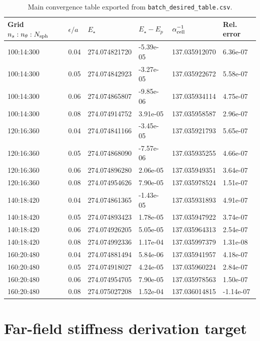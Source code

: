 \documentclass[11pt]{article}
\begin{document}
\begin{table}[p]
\centering
\caption{Main convergence table exported from \texttt{batch\_desired\_table.csv}.}
\small
\begin{tabular}{@{}llllll@{}}
\toprule
Grid $n_s:n_\theta:N_{\rm sph}$ & $\epsilon/a$ & $E_\star$ & $E_\star-E_p$ & $\alpha_{\rm cell}^{-1}$ & Rel. error \\
\midrule
100:14:300 & 0.04 & 274.074821720 & -5.39e-05 & 137.035912070 & 6.36e-07 \\
100:14:300 & 0.05 & 274.074842923 & -3.27e-05 & 137.035922672 & 5.58e-07 \\
100:14:300 & 0.06 & 274.074865807 & -9.85e-06 & 137.035934114 & 4.75e-07 \\
100:14:300 & 0.08 & 274.074914752 & 3.91e-05 & 137.035958587 & 2.96e-07 \\
120:16:360 & 0.04 & 274.074841166 & -3.45e-05 & 137.035921793 & 5.65e-07 \\
120:16:360 & 0.05 & 274.074868090 & -7.57e-06 & 137.035935255 & 4.66e-07 \\
120:16:360 & 0.06 & 274.074896280 & 2.06e-05 & 137.035949351 & 3.64e-07 \\
120:16:360 & 0.08 & 274.074954626 & 7.90e-05 & 137.035978524 & 1.51e-07 \\
140:18:420 & 0.04 & 274.074861365 & -1.43e-05 & 137.035931893 & 4.91e-07 \\
140:18:420 & 0.05 & 274.074893423 & 1.78e-05 & 137.035947922 & 3.74e-07 \\
140:18:420 & 0.06 & 274.074926205 & 5.05e-05 & 137.035964313 & 2.54e-07 \\
140:18:420 & 0.08 & 274.074992336 & 1.17e-04 & 137.035997379 & 1.31e-08 \\
160:20:480 & 0.04 & 274.074881494 & 5.84e-06 & 137.035941957 & 4.18e-07 \\
160:20:480 & 0.05 & 274.074918027 & 4.24e-05 & 137.035960224 & 2.84e-07 \\
160:20:480 & 0.06 & 274.074954705 & 7.90e-05 & 137.035978563 & 1.50e-07 \\
160:20:480 & 0.08 & 274.075027208 & 1.52e-04 & 137.036014815 & -1.14e-07 \\
\bottomrule
\end{tabular}
\label{tab:fullbatch}
\end{table}



\section{Far-field stiffness derivation target}
\label{app:farfield-stiffness-target}
\end{document}
